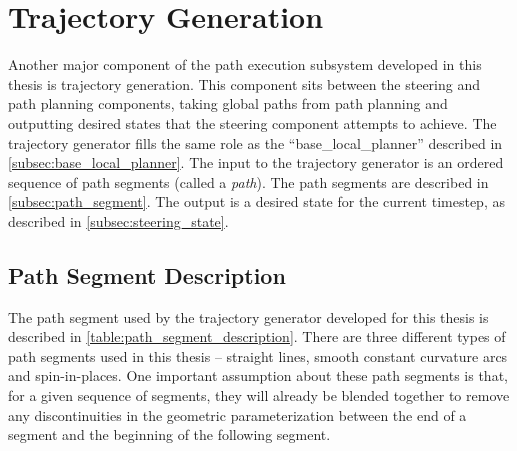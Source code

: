 \section{Trajectory Generation}\label{sec:trajectory_generation}

Another major component of the path execution subsystem developed in this thesis is trajectory generation. This component sits between the steering and path planning components, taking global paths from path planning and outputting desired states that the steering component attempts to achieve. The trajectory generator fills the same role as the ``base\_local\_planner'' described in \autoref{subsec:base_local_planner}. The input to the trajectory generator is an ordered sequence of path segments (called a \emph{path}). The path segments are described in \autoref{subsec:path_segment}. The output is a desired state for the current timestep, as described in \autoref{subsec:steering_state}.

\subsection{Path Segment Description}\label{subsec:path_segment}

The path segment used by the trajectory generator developed for this thesis is described in \autoref{table:path_segment_description}. There are three different types of path segments used in this thesis -- straight lines, smooth constant curvature arcs and spin-in-places. One important assumption about these path segments is that, for a given sequence of segments, they will already be blended together to remove any discontinuities in the geometric parameterization between the end of a segment and the beginning of the following segment.

